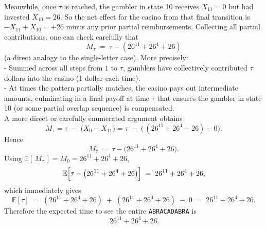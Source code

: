 \documentclass{article}
\begin{document}
\begin{enumerate}
{Meanwhile, once $\tau$ is reached, the gambler in state 10 receives $X_{11}=0$ but had invested $X_{10}=26$. So the net effect for the casino from that final transition is $-X_{11}+X_{10}=+26$ minus any prior partial reimbursements. Collecting all partial contributions, one can check carefully that
\[
M_{\tau} \;=\; \tau - (26^{11} + 26^4 + 26)
\]
(a direct analogy to the single-letter case). More precisely: \\
- Summed across all steps from $1$ to $\tau$, gamblers have collectively contributed $\tau$ dollars into the casino (1 dollar each time). \\
- At times the pattern partially matches, the casino pays out intermediate amounts, culminating in a final payoff at time $\tau$ that ensures the gambler in state 10 (or some partial overlap sequence) is compensated. \\
A more direct or carefully enumerated argument obtains
\[
M_{\tau} 
= 
\tau \;-\; \bigl(X_0 - X_{11}\bigr)
= 
\tau \;-\; \bigl(\,(26^{11} + 26^4 + 26) - 0\bigr).
\]
Hence
\[
M_{\tau}
\;=\;
\tau - \bigl(26^{11} + 26^4 + 26\bigr).
\]
Using $\mathbb{E}[\,M_{\tau}\,] = M_0 = 26^{11}+26^4+26$,
\[
\mathbb{E}\Bigl[\tau - \bigl(26^{11} + 26^4 + 26\bigr)\Bigr]
\;=\;
26^{11} + 26^4 + 26,
\]
which immediately gives
\[
\mathbb{E}[\tau]
\;=\;
(26^{11} + 26^4 + 26) \;+\; (26^{11} + 26^4 + 26)
\;-\; 0
\;=\;
26^{11} + 26^4 + 26.
\]
Therefore the expected time to see the entire \texttt{ABRACADABRA} is 
\[
\boxed{\,26^{11} + 26^4 + 26.}
\]
    }

\end{enumerate}
\end{document}
